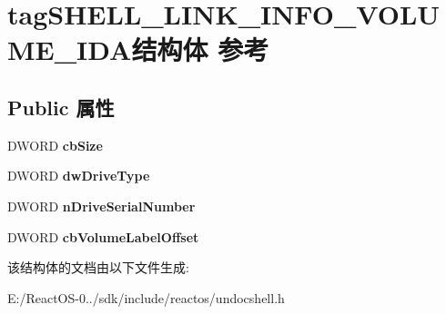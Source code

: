 \hypertarget{structtag_s_h_e_l_l___l_i_n_k___i_n_f_o___v_o_l_u_m_e___i_d_a}{}\section{tag\+S\+H\+E\+L\+L\+\_\+\+L\+I\+N\+K\+\_\+\+I\+N\+F\+O\+\_\+\+V\+O\+L\+U\+M\+E\+\_\+\+I\+D\+A结构体 参考}
\label{structtag_s_h_e_l_l___l_i_n_k___i_n_f_o___v_o_l_u_m_e___i_d_a}
\subsection*{Public 属性}
\begin{DoxyCompactItemize}
\item 
\mbox{\label{structtag_s_h_e_l_l___l_i_n_k___i_n_f_o___v_o_l_u_m_e___i_d_a_a8a84734ab4e4c6de20dc92837d9055c9}} 
D\+W\+O\+RD {\bfseries cb\+Size}
\item 
\mbox{\label{structtag_s_h_e_l_l___l_i_n_k___i_n_f_o___v_o_l_u_m_e___i_d_a_a022deaf90d8801602d6c55f23e4cad0f}} 
D\+W\+O\+RD {\bfseries dw\+Drive\+Type}
\item 
\mbox{\label{structtag_s_h_e_l_l___l_i_n_k___i_n_f_o___v_o_l_u_m_e___i_d_a_aeac47fa9204ccdc0e6e0fb2852757460}} 
D\+W\+O\+RD {\bfseries n\+Drive\+Serial\+Number}
\item 
\mbox{\label{structtag_s_h_e_l_l___l_i_n_k___i_n_f_o___v_o_l_u_m_e___i_d_a_a33667fd6efc6918bf0ff35bc9330eaee}} 
D\+W\+O\+RD {\bfseries cb\+Volume\+Label\+Offset}
\end{DoxyCompactItemize}


该结构体的文档由以下文件生成\+:\begin{DoxyCompactItemize}
\item 
E\+:/\+React\+O\+S-\/0../sdk/include/reactos/undocshell.\+h\end{DoxyCompactItemize}
